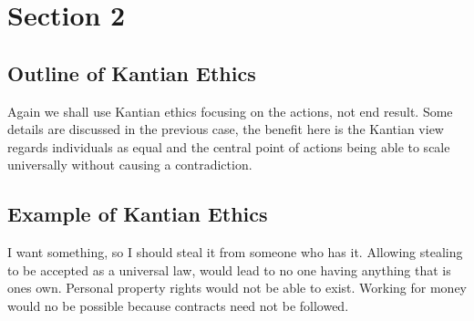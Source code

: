 \section{Section 2}
\subsection{Outline of Kantian Ethics}
Again we shall use Kantian ethics focusing on the actions, not end result. Some details are discussed in the previous case, the benefit here is the Kantian view regards individuals as equal and the central point of actions being able to scale universally without causing a contradiction. 
\subsection{Example of Kantian Ethics} 
I want something, so I should steal it from someone who has it. Allowing stealing to be accepted as a universal law, would lead to no one having anything that is ones own. Personal property rights would not be able to exist. Working for money would no be possible because contracts need not be followed.